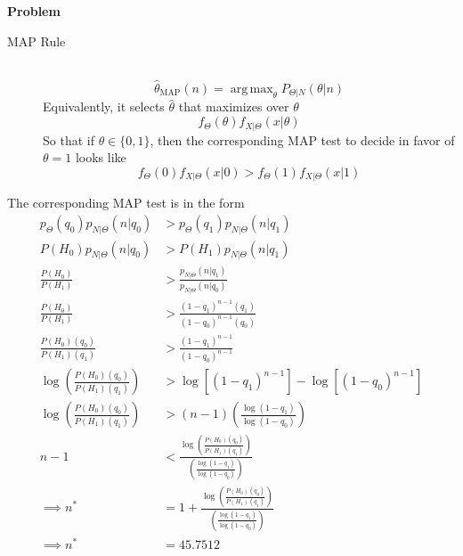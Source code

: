 \documentclass[12pt]{article}
\newenvironment{Ex}{\textbf{Problem}\vspace{.75em}\\}{}
\DeclareMathOperator*{\argmax}{arg\,max}
\begin{document}
\begin{enumerate}
\begin{Ex}
\begin{solution}
\begin{enumerate}
        \begin{mdframed}[backgroundcolor=silver]
          \begin{description}
          \item[MAP Rule] \hfill \\
            $$\hat{\theta}_{\text{MAP}}(n) = \argmax_{\theta}
            P_{\Theta|N}(\theta|n)$$
            Equivalently, it selects $\hat{\theta}$ that maximizes
            over $\theta$
            $$f_{\Theta}(\theta)f_{X|\Theta}(x|\theta)$$
            So that if $\theta\in\{0,1\}$, then the corresponding MAP
            test to decide in favor of $\theta=1$ looks like
            $$f_{\Theta}(0)f_{X|\Theta}(x|0) >
            f_{\Theta}(1)f_{X|\Theta}(x|1)$$
          \end{description}
        \end{mdframed}

        The corresponding MAP test is in the form
        \begin{equation}
          \label{eq:1a-map-test}
          \begin{aligned}
            p_{\Theta}(q_0)p_{N|\Theta}(n|q_0)
            &> p_{\Theta}(q_1)p_{N|\Theta}(n|q_1) \\
            P(H_0)p_{N|\Theta}(n|q_0)
            &> P(H_1)p_{N|\Theta}(n|q_1) \\
            \frac{P(H_0)}{P(H_1)}
            &> \frac{p_{N|\Theta}(n|q_1)}{p_{N|\Theta}(n|q_0)} \\
            \frac{P(H_0)}{P(H_1)}
            &> \frac{(1-q_1)^{n-1}(q_1)}{(1-q_0)^{n-1}(q_0)} \\
            \frac{P(H_0)(q_0)}{P(H_1)(q_1)}
            &> \frac{(1-q_1)^{n-1}}{(1-q_0)^{n-1}} \\
            \log\left(\frac{P(H_0)(q_0)}{P(H_1)(q_1)}\right)
            &> \log[(1-q_1)^{n-1}] - \log[(1-q_0)^{n-1}] \\
            \log\left(\frac{P(H_0)(q_0)}{P(H_1)(q_1)}\right)
            &> (n-1)\left(\frac{\log(1-q_1)}{\log(1-q_0)}\right) \\
            n-1 &<
            \frac{\log\left(\frac{P(H_0)(q_0)}{P(H_1)(q_1)}\right)}
            {\left(\frac{\log(1-q_1)}{\log(1-q_0)}\right)} \\
            \implies n^* &= 1 +
            \frac{\log\left(\frac{P(H_0)(q_0)}{P(H_1)(q_1)}\right)}
            {\left(\frac{\log(1-q_1)}{\log(1-q_0)}\right)} \\
            \implies n^* &= 45.7512 \\
          \end{aligned}
        \end{equation}


\end{enumerate}
\end{solution}
\end{Ex}
\end{enumerate}
\end{document}

